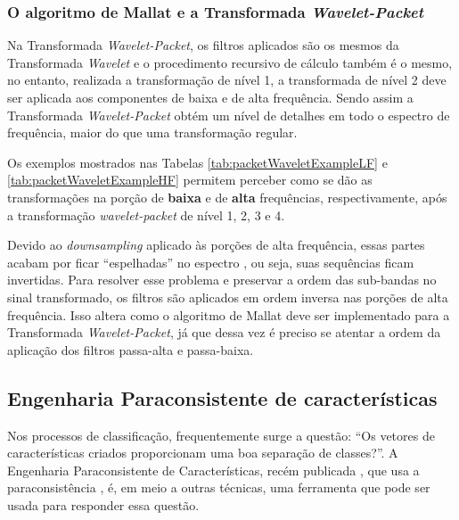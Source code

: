 		\subsubsection{O algoritmo de Mallat e a Transformada \textit{Wavelet-Packet}}
			\par Na Transformada \textit{Wavelet-Packet}, os filtros aplicados são os mesmos da Transformada \textit{Wavelet} e o procedimento recursivo de cálculo também é o mesmo, no entanto, realizada a transformação de nível 1, a transformada de nível 2 deve ser aplicada aos componentes de baixa e de alta frequência. Sendo assim a Transformada \textit{Wavelet-Packet} obtém um nível de detalhes em todo o espectro de frequência, maior do que uma transformação regular. 
			
			\par Os exemplos mostrados nas Tabelas \autoref{tab:packetWaveletExampleLF} e \autoref{tab:packetWaveletExampleHF} permitem perceber como se dão as transformações na porção de \textbf{baixa} e de \textbf{alta} frequências, respectivamente, após a transformação \textit{wavelet-packet} de nível 1, 2, 3 e 4.
			
			\par Devido ao \textit{downsampling} aplicado às porções de alta frequência, essas partes acabam por ficar ``espelhadas'' no espectro \cite{Jensen_2001}, ou seja, suas sequências ficam invertidas. Para resolver esse problema e preservar a ordem das sub-bandas no sinal transformado, os filtros são aplicados em ordem inversa nas porções de alta frequência. Isso altera como o algoritmo de Mallat deve ser implementado para a Transformada \textit{Wavelet-Packet}, já que dessa vez é preciso se atentar a ordem da aplicação dos filtros passa-alta e passa-baixa.
	
			
	
		\subsection{Engenharia Paraconsistente de características}
			\par Nos processos de classificação, frequentemente surge a questão: ``Os vetores de características criados proporcionam uma boa separação de classes?''. A Engenharia Paraconsistente de Características, recém publicada \cite{8588433}, que usa a paraconsistência \cite{da1998elementos},  \cite{COSTA2000} é, em meio a outras técnicas, uma ferramenta que pode ser usada para responder essa questão.
			

